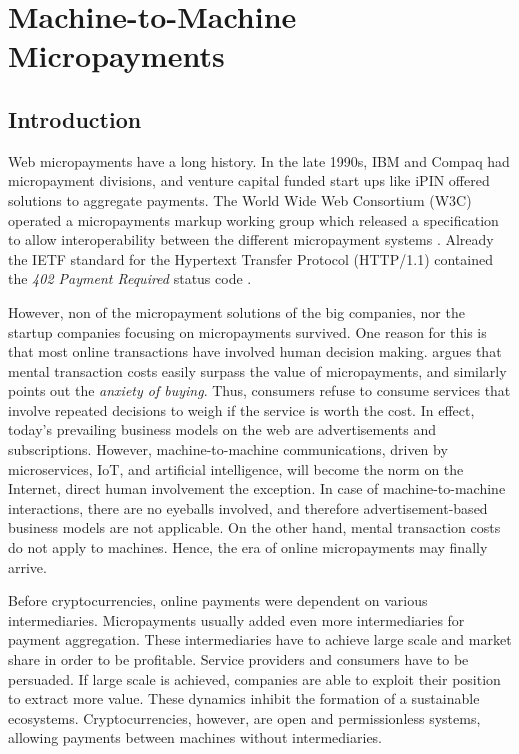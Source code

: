 \chapter{Machine-to-Machine Micropayments}
\label{sec:m2m}

\section{Introduction}

Web micropayments have a long history. In the late 1990s, IBM and Compaq had micropayment divisions, and venture capital funded start ups like iPIN offered solutions to aggregate payments. The World Wide Web Consortium (W3C) operated a micropayments markup working group which released a specification to allow interoperability between the different micropayment systems \parencite{w3c1999}. Already the IETF standard for the Hypertext Transfer Protocol (HTTP/1.1) contained the \emph{402 Payment Required} status code \parencite{fielding1999hypertext}.

However, non of the micropayment solutions of the big companies, nor the startup companies focusing on micropayments survived. One reason for this is that most online transactions have involved human decision making. \cite{szabo1999micropayments} argues that mental transaction costs easily surpass the value of micropayments, and similarly \cite{shirky2000} points out the \emph{anxiety of buying}. Thus, consumers refuse to consume services that involve repeated decisions to weigh if the service is worth the cost. In effect, today's prevailing business models on the web are advertisements and subscriptions. However, machine-to-machine communications, driven by microservices, IoT, and artificial intelligence, will become the norm on the Internet, direct human involvement the exception. In case of machine-to-machine interactions, there are no eyeballs involved, and therefore advertisement-based business models are not applicable. On the other hand, mental transaction costs do not apply to machines. Hence, the era of online micropayments may finally arrive.

Before cryptocurrencies, online payments were dependent on various intermediaries. Micropayments usually added even more intermediaries for payment aggregation. These intermediaries have to achieve large scale and market share in order to be profitable. Service providers and consumers have to be persuaded. If large scale is achieved, companies are able to exploit their position to extract more value. These dynamics inhibit the formation of a sustainable ecosystems. Cryptocurrencies, however, are open and permissionless systems, allowing payments between machines without intermediaries.

